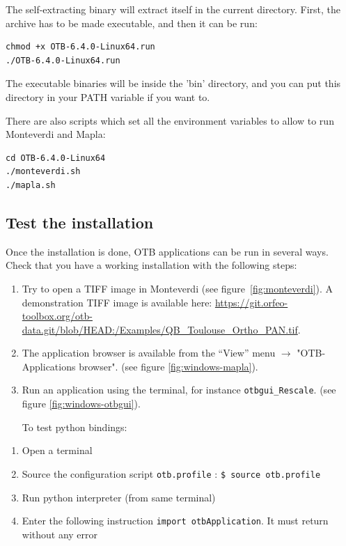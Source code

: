 \documentclass[10pt,a4paper]{article}
\begin{document}
The self-extracting binary will extract itself in the current directory. First, the archive has to be made executable, and then it can be run:
\begin{verbatim}
chmod +x OTB-6.4.0-Linux64.run
./OTB-6.4.0-Linux64.run
\end{verbatim}

The executable binaries will be inside the 'bin' directory, and you can put this directory in your PATH variable if you want to. 

There are also scripts which set all the environment variables to allow to run Monteverdi and Mapla:
\begin{verbatim}
cd OTB-6.4.0-Linux64
./monteverdi.sh
./mapla.sh
\end{verbatim}

\subsection{Test the installation}
Once the installation is done, OTB applications can be run in several ways. Check that you have a working installation with the following steps:
\begin{enumerate}

\item Try to open a TIFF image in Monteverdi (see
figure~\ref{fig:monteverdi}). A demonstration TIFF image is available here: \url{https://git.orfeo-toolbox.org/otb-data.git/blob/HEAD:/Examples/QB\_Toulouse\_Ortho\_PAN.tif}.

\item The application browser is available from the ``View'' menu 
$\rightarrow$ "OTB-Applications browser".
(see figure \ref{fig:windows-mapla}).

\item Run an application using the terminal, for instance
\texttt{otbgui\_Rescale}. (see figure \ref{fig:windows-otbgui}).

To test python bindings:

\end{enumerate}

\begin{enumerate}
 \item Open a terminal
 \item Source the configuration script \verb?otb.profile? : \verb?$ source otb.profile?
 \item Run python interpreter (from same terminal)
 \item Enter the following instruction \verb?import otbApplication?. It must return without any error
\end{enumerate}
\end{document}
